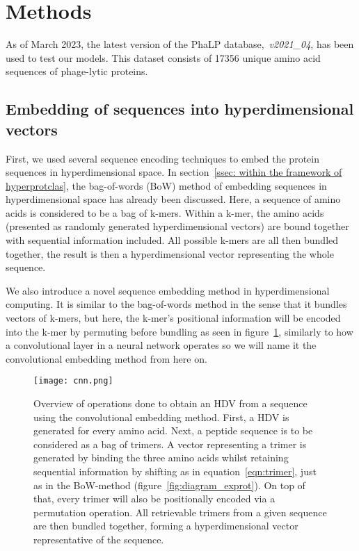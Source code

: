 \section{Methods}
As of March 2023, the latest version of the PhaLP database,~\textit{v2021\_04}, has been used to test our models. This dataset consists of 17356 unique amino acid sequences of phage-lytic proteins.
\subsection*{Embedding of sequences into hyperdimensional vectors}
First, we used several sequence encoding techniques to embed the protein sequences in hyperdimensional space. In section~\ref{ssec: within the framework of hyperprotclas}, the bag-of-words (BoW) method of embedding sequences in hyperdimensional space has already been discussed. Here, a sequence of amino acids is considered to be a bag of k-mers. Within a k-mer, the amino acids (presented as randomly generated hyperdimensional vectors) are bound together with sequential information included. All possible k-mers are all then bundled together, the result is then a hyperdimensional vector representing the whole sequence. 

We also introduce a novel sequence embedding method in hyperdimensional computing. It is similar to the bag-of-words method in the sense that it bundles vectors of k-mers, but here, the k-mer's positional information will be encoded into the k-mer by permuting before bundling as seen in figure~\ref{fig:cnn}, similarly to how a convolutional layer in a neural network operates so we will name it the convolutional embedding method from here on.

\begin{figure}[h]
    \centering
    \texttt{[image: cnn.png]}
    \caption{Overview of operations done to obtain an HDV from a sequence using the convolutional embedding method. First, a HDV is generated for every amino acid. Next, a peptide sequence is to be considered as a bag of trimers. A vector representing a trimer is generated by binding the three amino acids whilst retaining sequential information by shifting as in equation~\ref{eqn:trimer}, just as in the BoW-method (figure~\ref{fig:diagram_exprot}). On top of that, every trimer will also be positionally encoded via a permutation operation. All retrievable trimers from a given sequence are then bundled together, forming a hyperdimensional vector representative of the sequence.}
    \label{fig:cnn}
\end{figure}

